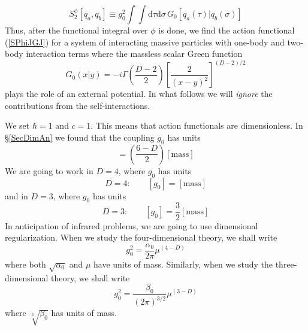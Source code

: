 \begin{equation}
	S_{2}^{\phi}[q_{a}, q_{b}] \equiv g^{2}_{0} \int \int \mathrm{d}\tau \mathrm{d}\sigma \, G_{0} \left[ q_{a}(\tau) | q_{b}(\sigma) \right] \label{S2Sca}
\end{equation}
Thus, after the functional integral over $\phi$ is done, we find the action functional (\ref{SPhiJGJ}) for a system of interacting massive particles with one-body and two-body interaction terms where the massless scalar Green function
\begin{equation}
	G_{0}(x|y) = -i \Gamma\left( \frac{D-2}{2} \right) \left[ \frac{2}{(x - y)^{2}} \right]^{(D-2)/2}
\end{equation}
plays the role of an external potential. In what follows we will \textit{ignore} the contributions from the self-interactions.

We set $\hbar = 1$ and $c = 1$. This means that action functionals are dimensionless. In \S\ref{SecDimAn} we found that the coupling $g_{0}$ has units
\begin{equation}
	[g_{0}] = \left( \frac{6 - D}{2} \right) [\text{mass}]
\end{equation}
We are going to work in $D = 4$, where $g_{0}$ has units
\begin{equation}
	D = 4: \qquad [g_{0}] = [\text{mass}]
\end{equation}
and in $D = 3$, where $g_{0}$ has units
\begin{equation}
	D = 3: \qquad [g_{0}] = \frac{3}{2} [\text{mass}]
\end{equation}
In anticipation of infrared problems, we are going to use dimensional regularization. When we study the four-dimensional theory, we shall write
\begin{equation}
	g_{0}^{2} = \frac{\alpha_{0}}{2 \pi} \mu^{(4 - D)} \label{g2Sca}
\end{equation}
where both $\sqrt{\alpha_{0}}$ and $\mu$ have units of mass. Similarly, when we study the three-dimensional theory, we shall write
\begin{equation}
	g_{0}^{2} = \frac{\beta_{0}}{(2 \pi)^{3/2}} \mu^{(3 - D)} \label{g2ScaD3}
\end{equation}
where $\sqrt[3]{\beta_{0}}$ has units of mass.

